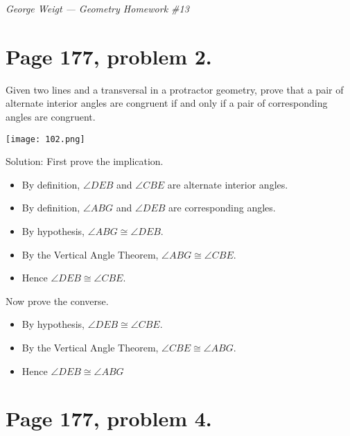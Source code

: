 \documentclass[12pt,openany]{report}
\begin{document}
\noindent
{\it George Weigt --- Geometry Homework \#13}

\section*{Page 177, problem 2.}

Given two lines and a transversal in a protractor geometry,
prove that a pair of alternate interior angles are congruent
if and only if a pair of corresponding angles are congruent.

\bigskip
\noindent
\texttt{[image: 102.png]}

\bigskip
\noindent
Solution: First prove the implication.

\begin{itemize}

\item[]
By definition, $\angle DEB$ and $\angle CBE$ are alternate interior angles.

\item[]
By definition, $\angle ABG$ and $\angle DEB$ are corresponding angles.

\item[]
By hypothesis, $\angle ABG\cong\angle DEB$.

\item[]
By the Vertical Angle Theorem, $\angle ABG\cong\angle CBE$.

\item[]
Hence $\angle DEB\cong\angle CBE$.

\end{itemize}

\noindent
Now prove the converse.

\begin{itemize}

\item[]
By hypothesis, $\angle DEB\cong\angle CBE$.

\item[]
By the Vertical Angle Theorem, $\angle CBE\cong\angle ABG$.

\item[]
Hence $\angle DEB\cong\angle ABG$

\end{itemize}

\newpage

\section*{Page 177, problem 4.}
\end{document}
